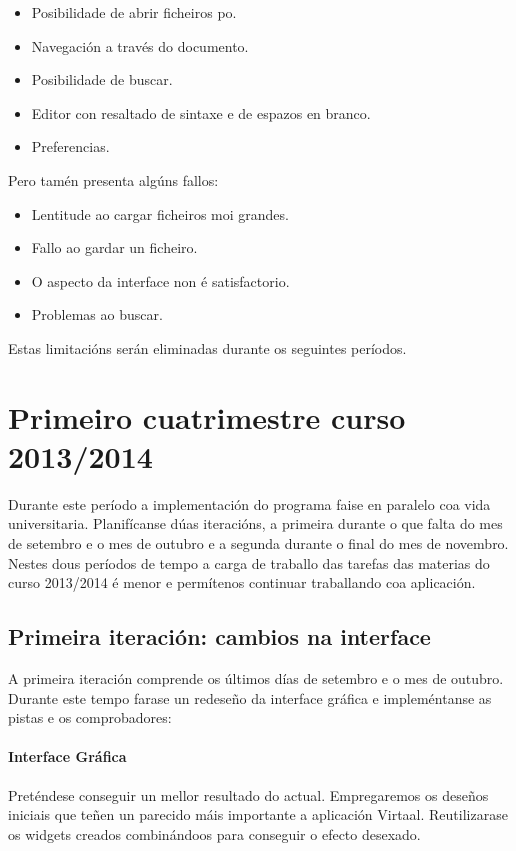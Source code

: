 \begin{itemize}
  \item Posibilidade de abrir ficheiros po.
  \item Navegación a través do documento.
  \item Posibilidade de buscar.
  \item Editor con resaltado de sintaxe e de espazos en branco.
  \item Preferencias.
\end{itemize}

Pero tamén presenta algúns fallos:

\begin{itemize}
  \item Lentitude ao cargar ficheiros moi grandes.
  \item Fallo ao gardar un ficheiro.
  \item O aspecto da interface non é satisfactorio.
  \item Problemas ao buscar.
\end{itemize}

Estas limitacións serán eliminadas durante os seguintes períodos.


\section{Primeiro cuatrimestre curso 2013/2014}

Durante este período a implementación do programa faise en paralelo coa vida universitaria. Planifícanse dúas iteracións, a primeira durante o que falta do mes de setembro e o mes de outubro e a segunda durante o final do mes de novembro. Nestes dous períodos de tempo a carga de traballo das tarefas das materias do curso 2013/2014 é menor e permítenos continuar traballando coa aplicación.

\subsection{Primeira iteración: cambios na interface}
A primeira iteración comprende os últimos días de setembro e o mes de outubro. Durante este tempo farase un redeseño da interface gráfica e impleméntanse as pistas e os comprobadores:

\paragraph{Interface Gráfica} Preténdese conseguir un mellor resultado do actual. Empregaremos os deseños iniciais que teñen un parecido máis importante a aplicación Virtaal. Reutilizarase os widgets creados combinándoos para conseguir o efecto desexado.


